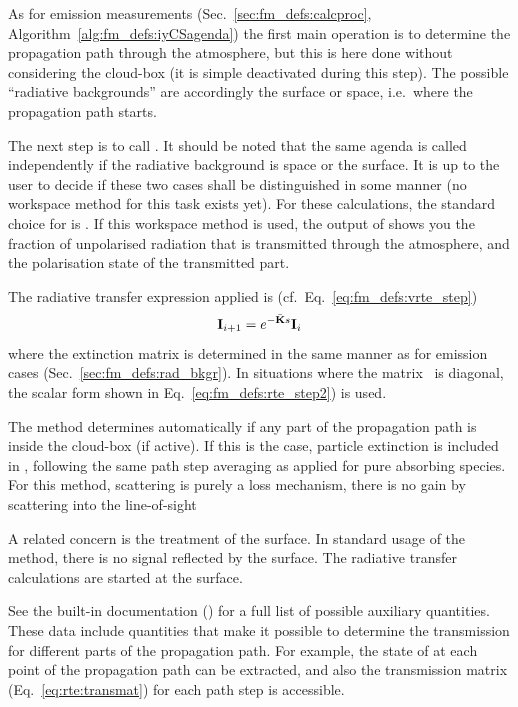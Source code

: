 As for emission measurements (Sec.~\ref{sec:fm_defs:calcproc},
Algorithm~\ref{alg:fm_defs:iyCSagenda}) the first main operation is to
determine the propagation path through the atmosphere, but this is here done
without considering the cloud-box (it is simple deactivated during this step).
The possible ``radiative backgrounds'' are accordingly the surface or space,
i.e.\ where the propagation path starts. 

The next step is to call . It should be
noted that the same agenda is called independently if the radiative background
is space or the surface. It is up to the user to decide if these two cases
shall be distinguished in some manner (no workspace method for this task exists
yet). For these calculations, the standard choice for
 is . If this
workspace method is used, the output of 
shows you the fraction of unpolarised radiation that is transmitted through the
atmosphere, and the polarisation state of the transmitted part.

The radiative transfer expression applied is
(cf.~Eq.~\ref{eq:fm_defs:vrte_step})
\begin{equation}
  \label{eq:trans:vrte}
  {\bf I}_{i+1} = e^{-\bar{{\bf K}}s} {\bf I}_i 
\end{equation}
where the extinction matrix is determined in the same manner as for emission
cases (Sec.~\ref{sec:fm_defs:rad_bkgr}). In situations where the matrix
\ExtMat\ is diagonal, the scalar form shown in Eq.~\ref{eq:fm_defs:rte_step2})
is used.

The method determines automatically if any part of the propagation path is
inside the cloud-box (if active). If this is the case, particle extinction is
included in \ExtMat, following the same path step averaging as applied for
pure absorbing species. For this method, scattering is purely a loss mechanism,
there is no gain by scattering into the line-of-sight

A related concern is the treatment of the surface. In standard usage of the
method, there is no signal reflected by the surface. The radiative transfer
calculations are started at the surface.

See the built-in documentation () for a full
list of possible auxiliary quantities. These data include quantities that make
it possible to determine the transmission for different parts of the
propagation path. For example, the state of  at each point of
the propagation path can be extracted, and also the transmission matrix
(Eq.~\ref{eq:rte:transmat}) for each path step is accessible.





